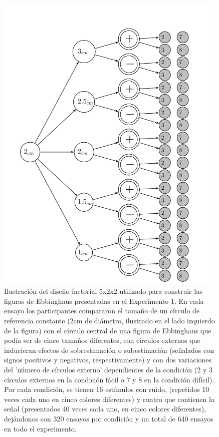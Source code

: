 \begin{itemize}
\begin{figure}[th]
\centering
\includegraphics[width=0.99\textwidth]{Figures/Estimulos_Experimento1} 
\decoRule
\caption[Diseño de Estimulos en el Experimento 1]{Ilustración del diseño factorial 5x2x2 utilizado para construir las figuras de Ebbinghaus presentadas en el Experimento 1. En cada ensayo los participantes compararon el tamaño de un círculo de referencia constante (2cm de diámetro, ilustrado en el lado izquierdo de la figura) con el círculo central de una figura de Ebbinghaus que podía ser de cinco tamaños diferentes, con círculos externos que inducieran efectos de sobrestimación o subestimación (señalados con signos positivos y negativos, respectivamente) y con dos variaciones del 'número de círculos externo' dependientes de la condición (2 y 3 círculos externos en la condición fácil o 7 y 8 en la condición difícil). Por cada condición, se tienen 16 estímulos con ruido, (repetidos 10 veces cada uno en cinco colores diferentes) y cuatro que contienen la señal (presentados 40 veces cada uno, en cinco colores diferentes), dejándonos con 320 ensayos por condición y un total de 640 ensayos en todo el experimento.}
\label{fig:Exp_1}
\end{figure}


\end{itemize}
